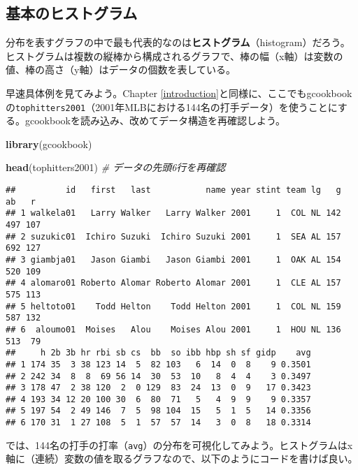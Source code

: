 \documentclass[]{book}
\newenvironment{Shaded}{\begin{snugshade}}{\end{snugshade}}
\newcommand{\KeywordTok}[1]{\textcolor[rgb]{0.13,0.29,0.53}{\textbf{#1}}}
\newcommand{\CommentTok}[1]{\textcolor[rgb]{0.56,0.35,0.01}{\textit{#1}}}
\newcommand{\NormalTok}[1]{#1}
\begin{document}
\subsection{基本のヒストグラム}

分布を表すグラフの中で最も代表的なのは\textbf{ヒストグラム}（histogram）だろう。ヒストグラムは複数の縦棒から構成されるグラフで、棒の幅（x軸）は変数の値、棒の高さ（y軸）はデータの個数を表している。

早速具体例を見てみよう。Chapter
\ref{introduction}と同様に、ここでもgcookbookの\texttt{tophitters2001}（2001年MLBにおける144名の打手データ）を使うことにする。gcookbookを読み込み、改めてデータ構造を再確認しよう。

\begin{Shaded}
\begin{Highlighting}[]
\KeywordTok{library}\NormalTok{(gcookbook)}
\end{Highlighting}
\end{Shaded}

\begin{Shaded}
\begin{Highlighting}[]
\KeywordTok{head}\NormalTok{(tophitters2001) }\CommentTok{# データの先頭6行を再確認}
\end{Highlighting}
\end{Shaded}

\begin{verbatim}
##          id   first   last           name year stint team lg   g  ab   r
## 1 walkela01   Larry Walker   Larry Walker 2001     1  COL NL 142 497 107
## 2 suzukic01  Ichiro Suzuki  Ichiro Suzuki 2001     1  SEA AL 157 692 127
## 3 giambja01   Jason Giambi   Jason Giambi 2001     1  OAK AL 154 520 109
## 4 alomaro01 Roberto Alomar Roberto Alomar 2001     1  CLE AL 157 575 113
## 5 heltoto01    Todd Helton    Todd Helton 2001     1  COL NL 159 587 132
## 6  aloumo01  Moises   Alou    Moises Alou 2001     1  HOU NL 136 513  79
##     h 2b 3b hr rbi sb cs  bb  so ibb hbp sh sf gidp    avg
## 1 174 35  3 38 123 14  5  82 103   6  14  0  8    9 0.3501
## 2 242 34  8  8  69 56 14  30  53  10   8  4  4    3 0.3497
## 3 178 47  2 38 120  2  0 129  83  24  13  0  9   17 0.3423
## 4 193 34 12 20 100 30  6  80  71   5   4  9  9    9 0.3357
## 5 197 54  2 49 146  7  5  98 104  15   5  1  5   14 0.3356
## 6 170 31  1 27 108  5  1  57  57  14   3  0  8   18 0.3314
\end{verbatim}

では、144名の打手の打率（\texttt{avg}）の分布を可視化してみよう。ヒストグラムはx軸に（連続）変数の値を取るグラフなので、以下のようにコードを書けば良い。
\end{document}

